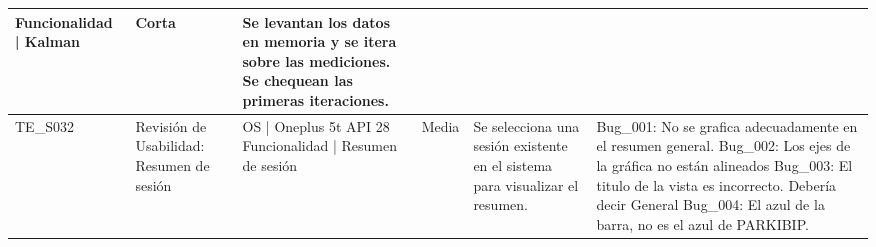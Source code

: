 \begin{longtable}{| p{1.5cm} | p{3cm}| p{2cm}| p{1.5cm}| p{4cm} | p{4cm}|}
Funcionalidad | Kalman & Corta & Se levantan los datos en memoria y se itera sobre las mediciones. Se chequean las primeras iteraciones. &  \\ \hline
TE\_S032 & Revisión de Usabilidad: Resumen de sesión & OS | Oneplus 5t API 28
Funcionalidad | Resumen de sesión & Media & Se selecciona una sesión existente en el sistema para visualizar el resumen. & Bug\_001: No se grafica adecuadamente en el resumen general.
Bug\_002: Los ejes de la gráfica no están alineados
Bug\_003: El titulo de la vista es incorrecto. Debería decir General
Bug\_004: El azul de la barra, no es el azul de PARKIBIP. \\ \hline
\end{longtable}
\normalsize
